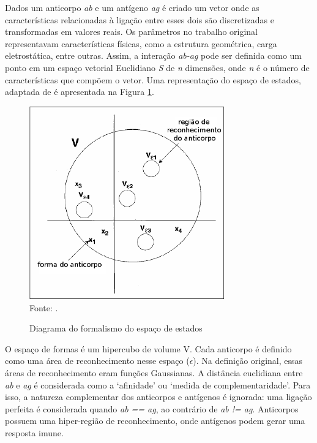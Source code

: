 Dados um anticorpo \emph{ab} e um antígeno \emph{ag} é criado um vetor onde as características relacionadas à ligação entre esses dois são discretizadas e transformadas em valores reais. Os parâmetros no trabalho original representavam características físicas, como a estrutura geométrica, carga eletrostática, entre outras. Assim, a interação \emph{ab-ag} pode ser definida como um ponto em um espaço vetorial Euclidiano \emph{S} de \emph{n} dimensões, onde \emph{n} é o número de características que compõem o vetor. Uma representação do espaço de estados, adaptada de \citet{Brownlee2007} é apresentada na Figura \ref{img:space}.

\begin{figure}[h!]
    \caption{Diagrama do formalismo do espaço de estados}
    \label{img:space}
    \centering
    \includegraphics[width=0.75\textwidth]{img/space.png}
    \\ Fonte: \cite{Brownlee2007}.
\end{figure}

O espaço de formas é um hipercubo de volume V. Cada anticorpo é definido como uma área de reconhecimento nesse espaço ($\epsilon$). Na definição original, essas áreas de reconhecimento eram funções Gaussianas. A distância euclidiana entre \emph{ab} e \emph{ag} é considerada como a `afinidade' ou `medida de complementaridade'. Para isso, a natureza complementar dos anticorpos e antígenos é ignorada: uma ligação perfeita é considerada quando \emph{ab == ag}, ao contrário de \emph{ab != ag}. Anticorpos possuem uma hiper-região de reconhecimento, onde antígenos podem gerar uma resposta imune.

